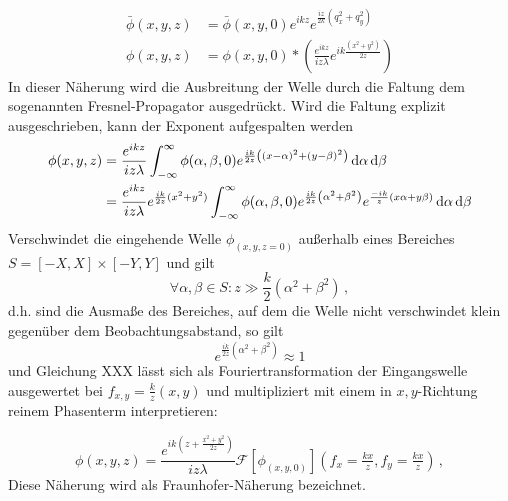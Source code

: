 \begin{align}
\bar{\phi}(x,y, z)&=\bar{\phi}(x,y,0) e^{ik z}e^{\frac{i z}{2k}(q_x^2+q_y^2)}\\
\phi(x,y, z)&=\phi(x,y,0) \ast \left(
\frac{e^{ik z}}{i z \lambda } 
e^{ik\frac{(x^2+y^2)}{2 z}}
\right)
\end{align}
In dieser Näherung wird die Ausbreitung der Welle durch die Faltung dem sogenannten Fresnel-Propagator ausgedrückt. Wird die Faltung explizit ausgeschrieben, kann der Exponent aufgespalten werden
\begin{align}
\phi(x,y, z)&=\frac{e^{ikz}}{iz\lambda}
\int_{-\infty}^\infty 
\phi(\alpha,\beta,0)
e^{\frac{ik}{2z}\left(\left(x-\alpha\right)^2+\left(y-\beta\right)^2\right)}
\dif \alpha \dif \beta \nonumber \\
&=\frac{e^{ikz}}{iz\lambda}e^{\frac{ik}{2z}(x^2+y^2)}
\int_{-\infty}^\infty 
\phi(\alpha,\beta,0)
e^{\frac{ik}{2z}\left(\alpha^2+\beta^2\right)}
e^{\frac{-ik}{ z}\left(x\alpha+y\beta\right)}
\dif \alpha \dif \beta
\end{align}
Verschwindet die eingehende Welle $\phi_(x,y,z=0)$ außerhalb eines Bereiches $S=[-X,X]\times[-Y,Y]$ und gilt 
\begin{equation}
\forall \alpha,\beta \in S:	z\gg \frac{k}{2}\left(\alpha^2+\beta^2\right) \, , 
\end{equation}
d.h. sind die Ausmaße des Bereiches, auf dem die Welle nicht verschwindet klein gegenüber dem Beobachtungsabstand, so gilt
\begin{equation}
e^{\frac{ik}{2z}\left(\alpha^2+\beta^2\right)}\approx 1
\end{equation}
und Gleichung XXX lässt sich als Fouriertransformation der Eingangswelle ausgewertet bei $f_{x,y}=\tfrac{k}{z}(x,y)$ und multipliziert mit einem in $x,y$-Richtung reinem Phasenterm interpretieren:

\begin{equation}
\phi(x,y,z)=\frac{e^{ik(z+\frac{x^2+y^2}{2z})}}{iz\lambda}\mathscr{F}\left[\phi_(x,y,0)\right](f_x=\tfrac{kx}{z},f_y=\tfrac{kx}{z}) \, ,
\end{equation}
Diese Näherung wird als Fraunhofer-Näherung bezeichnet.

